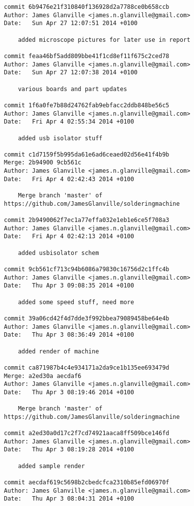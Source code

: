 \documentclass[a4paper,11pt]{article}  %
\begin{document}
\begin{lstlisting}[frame=single]
commit 6b9476e21f310840f136928d2a7788ce0b658ccb
Author: James Glanville <james.n.glanville@gmail.com>
Date:   Sun Apr 27 12:07:51 2014 +0100

    added microscope pictures for later use in report

commit feaa46bf5add809bbe41f1cd8ef11f675c2ced78
Author: James Glanville <james.n.glanville@gmail.com>
Date:   Sun Apr 27 12:07:38 2014 +0100

    various boards and part updates

commit 1f6a0fe7b88d24762fab9ebfacc2ddb848be56c5
Author: James Glanville <james.n.glanville@gmail.com>
Date:   Fri Apr 4 02:55:34 2014 +0100

    added usb isolator stuff

commit c1d7159f5b995da61e6ad6ceaed02d56e41f4b9b
Merge: 2b94900 9cb561c
Author: James Glanville <james.n.glanville@gmail.com>
Date:   Fri Apr 4 02:42:43 2014 +0100

    Merge branch 'master' of https://github.com/JamesGlanville/solderingmachine

commit 2b9490062f7ec1a77effa032e1eb1e6ce5f708a3
Author: James Glanville <james.n.glanville@gmail.com>
Date:   Fri Apr 4 02:42:13 2014 +0100

    added usbisolator schem

commit 9cb561cf713c94b6086a79830c16756d2c1ffc4b
Author: James Glanville <james.n.glanville@gmail.com>
Date:   Thu Apr 3 09:08:35 2014 +0100

    added some speed stuff, need more

commit 39a06cd42f4d7dde3f992bbea79089458be64e4b
Author: James Glanville <james.n.glanville@gmail.com>
Date:   Thu Apr 3 08:36:49 2014 +0100

    added render of machine

commit ca871987b4c4e934171a2da9ce1b135ee693479d
Merge: a2ed30a aecdaf6
Author: James Glanville <james.n.glanville@gmail.com>
Date:   Thu Apr 3 08:19:46 2014 +0100

    Merge branch 'master' of https://github.com/JamesGlanville/solderingmachine

commit a2ed30a0d17c2f7cd74921aaca8ff509bce146fd
Author: James Glanville <james.n.glanville@gmail.com>
Date:   Thu Apr 3 08:19:28 2014 +0100

    added sample render

commit aecdaf619c5698b2cbedcfca2310b85efd06970f
Author: James Glanville <james.n.glanville@gmail.com>
Date:   Thu Apr 3 08:04:31 2014 +0100


\end{lstlisting}
\end{document}
